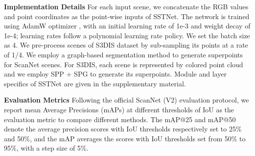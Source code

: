 \documentclass[10pt,twocolumn,letterpaper]{article}
\begin{document}
\begin{table}
    \centering
    \caption{3D instance segmentation on ScanNet (V2) benchmark (hidden testing set). Results of SSTNet are obtained by submitting onto the testing server the model trained on the ScanNet training set on January 4th, 2021. \label{tableScanNetResultsAP25AP50}}
\end{table}

\noindent\textbf{Implementation Details} For each input scene, we concatenate the RGB values and point coordinates as the point-wise inputs of SSTNet. The network is trained using AdamW optimizer \cite{loshchilov2019decoupled}, with an initial learning rate of 1e-3 and weight decay of 1e-4; learning rates follow a polynomial learning rate policy. We set the batch size as 4. We pre-process scenes of S3DIS dataset by sub-sampling its points at a rate of 1/4. We employ a graph-based segmentation method \cite{felzenszwalb2004efficient} to generate superpoints for ScanNet scenes. For S3DIS, each scene is represented by colored point cloud and we employ SPP + SPG \cite{landrieu2018large,landrieu2019point} to generate its superpoints. Module and layer specifics of SSTNet are given in the supplementary material. 

\noindent\textbf{Evaluation Metrics}
Following the official ScanNet (V2) evaluation protocol, we report mean Average Precisions (mAPs) at different thresholds of IoU as the evaluation metric to compare different methods. The mAP@25 and mAP@50 denote the average precision scores with IoU thresholds respectively set to 25\% and 50\%, and the mAP averages the scores with IoU thresholds set from 50\% to 95\%, with a step size of 5\%.
\end{document}
